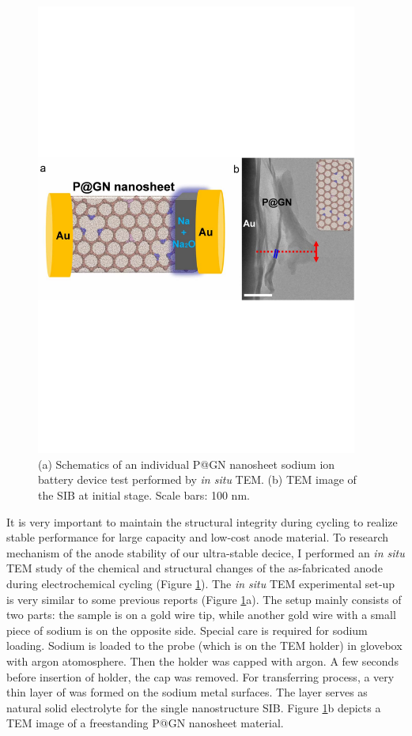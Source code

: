 \begin{figure}  
\centering
\includegraphics[width=300pt,angle=0]{figures/figure4_3ab}
\caption[{\em in situ} probing on P@GN SIB setup]
{
(a) Schematics of an individual P@GN nanosheet sodium ion battery device test performed by {\em in situ} TEM. 
(b) TEM image of the SIB at initial stage. Scale bars: 100 nm.
\label{fig:4_3ab}}
\end{figure}

It is very important to maintain the structural integrity during cycling to realize stable performance for large capacity and low-cost anode material.\cite{Liu2014a} 
To research mechanism of the anode stability of our ultra-stable decice, I performed an {\em in situ} TEM study of the chemical and structural changes of the as-fabricated anode during electrochemical cycling (Figure \ref{fig:4_3ab}). The {\em in situ} TEM experimental set-up is very similar to some previous reports (Figure \ref{fig:4_3ab}a).\cite{Wang2014f,Wang2012g} 
The setup mainly consists of two parts: the sample is on a gold wire tip, while another gold wire with a small piece of sodium is on the opposite side. Special care is required for sodium loading. Sodium is loaded to the probe (which is on the TEM holder) in glovebox with argon atomosphere. Then the holder was capped with argon. A few seconds before insertion of holder, the cap was removed. 
For transferring process, a very thin layer of  was formed on the sodium metal surfaces. The  layer serves as natural solid electrolyte for the single nanostructure SIB. Figure \ref{fig:4_3ab}b depicts a TEM image of a freestanding P@GN nanosheet material. 

